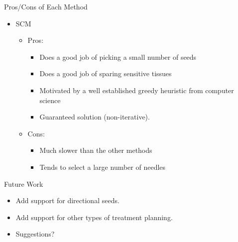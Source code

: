 \documentclass{beamer}
\begin{document}
\begin{frame}{Pros/Cons of Each Method}

  \begin{itemize}
    \item SCM
      \begin{itemize}
        \item Pros:
          \begin{itemize}
            \item Does a good job of picking a small number of seeds
            \item Does a good job of sparing sensitive tissues
            \item Motivated by a well established greedy heuristic from
              computer science
            \item Guaranteed solution (non-iterative).
          \end{itemize}
        \item Cons:
          \begin{itemize}
            \item Much slower than the other methods
            \item Tends to select a large number of needles
          \end{itemize}
      \end{itemize}
  \end{itemize}

\end{frame}

\begin{frame}{Future Work}

  \begin{itemize}
    \item Add support for directional seeds.
      \medskip
    \item Add support for other types of treatment planning.
      \medskip
    \item Suggestions?
  \end{itemize}

\end{frame}
\end{document}
